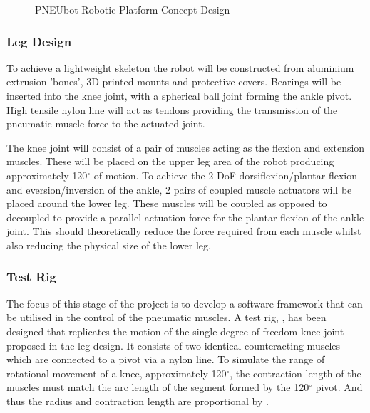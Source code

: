 \documentclass[11pt,a4paper]{article}
\begin{document}
\begin{figure}[!hbt]
    \caption{PNEUbot Robotic Platform Concept Design}
    \label{fig:platform}
\end{figure}

\subsubsection{Leg Design}
\label{subsubsection:leg_design}

To achieve a lightweight skeleton the robot will be constructed from aluminium extrusion 'bones', 3D printed mounts and protective covers. Bearings will be inserted into the knee joint, with a spherical ball joint forming the ankle pivot. High tensile nylon line will act as tendons providing the transmission of the pneumatic muscle force to the actuated joint. \newline

The knee joint will consist of a pair of muscles acting as the flexion and extension muscles. These will be placed on the upper leg area of the robot producing approximately 120$^{\circ}$ of motion. To achieve the 2 DoF dorsiflexion/plantar flexion and eversion/inversion of the ankle, 2 pairs of coupled muscle actuators will be placed around the lower leg. These muscles will be coupled as opposed to decoupled to provide a parallel actuation force for the plantar flexion of the ankle joint. This should theoretically reduce the force required from each muscle whilst also reducing the physical size of the lower leg. 

\subsubsection{Test Rig}
\label{subsubsection:Test Rig}
The focus of this stage of the project is to develop a software framework that can be utilised in the control of the pneumatic muscles. A test rig, , has been designed that replicates the motion of the single degree of freedom knee joint proposed in the leg design. It consists of two identical counteracting muscles which are connected to a pivot via a nylon line. To simulate the range of rotational movement of a knee, approximately 120$^{\circ}$, the contraction length of the muscles must match the arc length of the segment formed by the 120$^{\circ}$ pivot. And thus the radius and contraction length are proportional by . 
\end{document}
